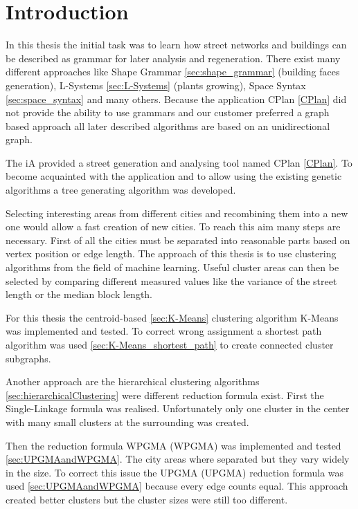 \chapter{Introduction}
In this thesis the initial task was to learn how street networks and buildings can be described as grammar for later analysis and regeneration. There exist many different approaches like Shape Grammar \ref{sec:shape_grammar} (building faces generation), L-Systems \ref{sec:L-Systems} (plants growing), Space Syntax \ref{sec:space_syntax} and many others. 
Because the application CPlan \ref{CPlan} did not provide the ability to use grammars and our customer preferred a graph based approach all later described algorithms are based on an unidirectional graph.

The \gls{iA} provided a street generation and analysing tool named CPlan \ref{CPlan}. To become acquainted with the application and to allow using the existing genetic algorithms a tree generating algorithm was developed. 

Selecting interesting areas from different cities and recombining them into a new one would allow a fast creation of new cities. To reach this aim many steps are necessary. First of all the cities must be separated into reasonable parts based on vertex position or edge length. The approach of this thesis is to use clustering algorithms from the field of machine learning. Useful cluster areas can then be selected by comparing different measured values like the variance of the street length or the median block length.

For this thesis the centroid-based \ref{sec:K-Means} clustering algorithm K-Means was implemented and tested. To correct wrong assignment a shortest path algorithm was used \ref{sec:K-Means_shortest_path} to create connected cluster subgraphs.

Another approach are the hierarchical clustering algorithms \ref{sec:hierarchicalClustering} were different reduction formula exist. First the Single-Linkage formula was realised. Unfortunately only one cluster in the center with many small clusters at the surrounding was created.

\newpage

Then the reduction formula \acrshort{WPGMA} (\acrlong{WPGMA}) was implemented and tested \ref{sec:UPGMAandWPGMA}. The city areas where separated but they vary widely in the size. To correct this issue the \acrshort{UPGMA} (\acrlong{UPGMA}) reduction formula was used \ref{sec:UPGMAandWPGMA} because every edge counts equal. This approach created better clusters but the cluster sizes were still too different.

